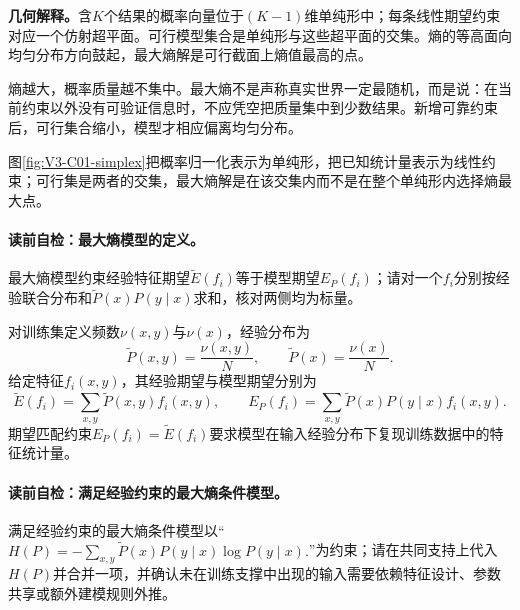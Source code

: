 \label{struct:V3-C01-CH10}
\label{struct:V3-C01-CH14}
\begin{geometrybox}
\textbf{几何解释。}含$K$个结果的概率向量位于$(K-1)$维单纯形中；每条线性期望约束对应一个仿射超平面。可行模型集合是单纯形与这些超平面的交集。熵的等高面向均匀分布方向鼓起，最大熵解是可行截面上熵值最高的点。
\end{geometrybox}

\label{struct:V3-C01-CH15}
\begin{probabilitybox}
熵越大，概率质量越不集中。最大熵不是声称真实世界一定最随机，而是说：在当前约束以外没有可验证信息时，不应凭空把质量集中到少数结果。新增可靠约束后，可行集合缩小，模型才相应偏离均匀分布。
\end{probabilitybox}

\label{struct:V3-C01-CH17}

图\ref{fig:V3-C01-simplex}把概率归一化表示为单纯形，把已知统计量表示为线性约束；可行集是两者的交集，最大熵解是在该交集内而不是在整个单纯形内选择熵最大点。


\paragraph{读前自检：最大熵模型的定义。}最大熵模型约束经验特征期望$\widetilde E(f_i)$等于模型期望$E_P(f_i)$；请对一个$f_i$分别按经验联合分布和$\widetilde P(x)P(y\mid x)$求和，核对两侧均为标量。\par

对训练集定义频数$\nu(x,y)$与$\nu(x)$，经验分布为
\[
\widetilde P(x,y)=\frac{\nu(x,y)}{N},\qquad
\widetilde P(x)=\frac{\nu(x)}{N}.
\]
给定特征$f_i(x,y)$，其经验期望与模型期望分别为
\[
\widetilde E(f_i)=\sum_{x,y}\widetilde P(x,y)f_i(x,y),
\qquad
E_P(f_i)=\sum_{x,y}\widetilde P(x)P(y\mid x)f_i(x,y).
\]
期望匹配约束$E_P(f_i)=\widetilde E(f_i)$要求模型在输入经验分布下复现训练数据中的特征统计量。

\paragraph{读前自检：满足经验约束的最大熵条件模型。}满足经验约束的最大熵条件模型以“$H(P)=-\sum_{x,y}\widetilde P(x)P(y\mid x)\log P(y\mid x).$”为约束；请在共同支持上代入$H(P)$并合并一项，并确认未在训练支撑中出现的输入需要依赖特征设计、参数共享或额外建模规则外推。\par

